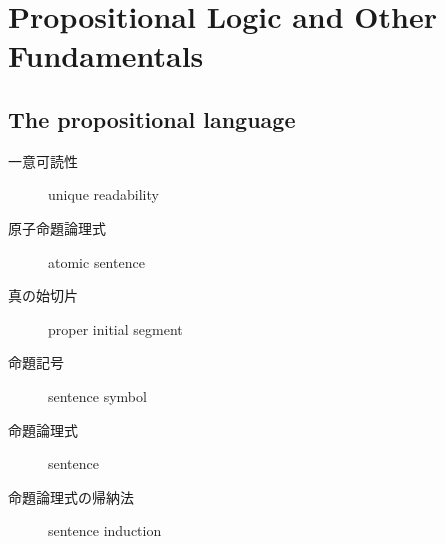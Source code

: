 \chapter{Propositional Logic and Other Fundamentals}



\section{The propositional language}

\begin{myfrm}[訳語対応]
  \begin{description}
    \item[一意可読性] unique readability
    \item[原子命題論理式] atomic sentence
    \item[真の始切片] proper initial segment
    \item[命題記号] sentence symbol
    \item[命題論理式] sentence
    \item[命題論理式の帰納法] sentence induction
  \end{description}
\end{myfrm}
















